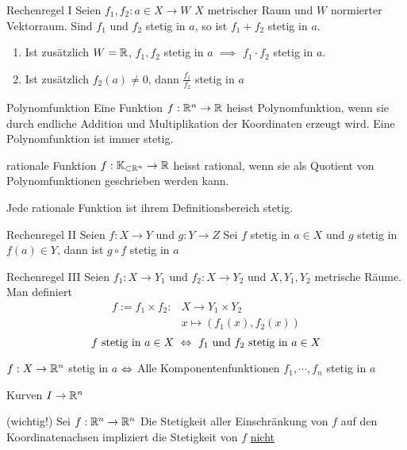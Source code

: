 \begin{Bem}{Rechenregel I}
  Seien $f_1,f_2:a\in X\to W$ $X$ metrischer Raum und $W$ normierter Vektorraum. Sind $f_1$ und $f_2$ stetig in $a$, so ist $f_1+f_2$ stetig in $a$.
  \begin{enumerate}
    \item Ist zusätzlich $W=\mathbb{R}$, $f_1,f_2$ stetig in $a$ $\implies$ $f_1\cdot f_2$ stetig in $a$.
    \item Ist zusätzlich $f_2(a)\neq 0$, dann $\frac{f_1}{f_2}$ stetig in $a$
  \end{enumerate}
\end{Bem}
\begin{Def}{Polynomfunktion}
  Eine Funktion $f:\mathbb{R}^n\to\mathbb{R}$ heisst Polynomfunktion, wenn sie durch endliche Addition und Multiplikation der Koordinaten erzeugt wird. Eine Polynomfunktion ist immer stetig.
\end{Def}
\begin{Def}{rationale Funktion}
  $f:\mathbb{K}_{\subset\mathbb{R}^n}\to\mathbb{R}$ heisst rational, wenn sie als Quotient von Polynomfunktionen geschrieben werden kann.
\end{Def}
\begin{Kor}
  Jede rationale Funktion ist ihrem Definitionsbereich stetig.
\end{Kor}
\begin{Bem}{Rechenregel II}
  Seien $f:X\to Y$ und $g:Y\to Z$ Sei $f$ stetig in $a\in X$ und $g$ stetig in $f(a)\in Y$, dann ist $g\circ f$ stetig in $a$  
\end{Bem}
\begin{Bem}{Rechenregel III}
  Seien $f_1:X\to Y_1$ und $f_2:X\to Y_2$ und $X,Y_1,Y_2$ metrische Räume. Man definiert
  \begin{align*}
    f:=f_1\times f_2:&X\to Y_1\times Y_2\\
    &x\mapsto (f_1(x),f_2(x))
  \end{align*}
  \[f\ \text{stetig in}\ a\in X\ \Lra\ f_1\ \text{und}\ f_2\ \text{stetig in}\ a\in X\]
\end{Bem}
\begin{Kor}
  $f:X\to\mathbb{R}^n$ stetig in $a$ $\Leftrightarrow$ Alle Komponentenfunktionen $f_1,\cdots,f_n$ stetig in $a$
\end{Kor}
\begin{Bsp}
  Kurven $I\to\mathbb{R}^n$  
\end{Bsp}
\begin{Bem}{(wichtig!)}
  Sei $f:\mathbb{R}^n\to\mathbb{R}^n$ Die Stetigkeit aller Einschränkung von $f$ auf den Koordinatenachsen impliziert die Stetigkeit von $f$ \underline{nicht}
\end{Bem}
